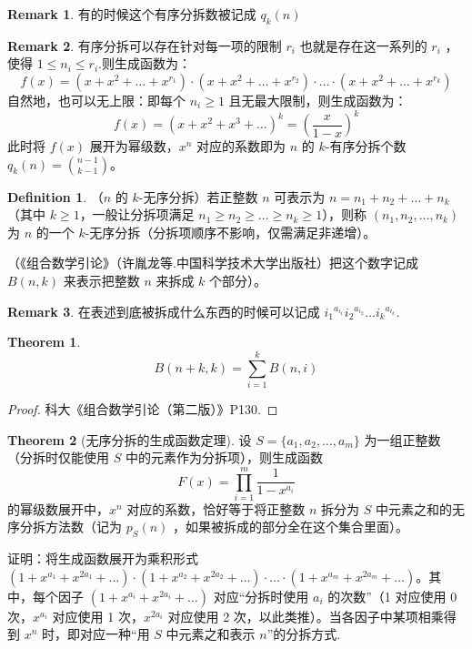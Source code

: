 \documentclass[oneside]{book}
\theoremstyle{definition}
\newtheorem{definition}{Definition}[section]
\newtheorem{theorem}{Theorem}[section]
\newtheorem{remark}{Remark}[section]
\begin{document}
\begin{remark}
	有的时候这个有序分拆数被记成 \(q_k(n)\)
\end{remark}
\begin{remark}
	有序分拆可以存在针对每一项的限制 \(r_i\) 也就是存在这一系列的 \(r_i\) ，使得 \(1\leq n_i\leq r_i\).则生成函数为：
	\[
	f(x) = (x + x^2 + \dots + x^{r_1}) \cdot (x + x^2 + \dots + x^{r_2}) \cdot \dots \cdot (x + x^2 + \dots + x^{r_k})
	\]
	自然地，也可以无上限：即每个 \( n_i \geq 1 \) 且无最大限制，则生成函数为：
	\[
	f(x) = (x + x^2 + x^3 + \dots)^k = \left( \frac{x}{1 - x} \right)^k
	\]
	此时将 \( f(x) \) 展开为幂级数，\( x^n \) 对应的系数即为 \( n \) 的 \( k \)-有序分拆个数 \( q_k(n)=\binom{n-1}{k-1} \)。
\end{remark}
\begin{definition}
	（\( n \) 的 \( k \)-无序分拆）若正整数 \( n \) 可表示为 \( n = n_1 + n_2 + \dots + n_k \)（其中 \( k \geq 1 \)，一般让分拆项满足 \( n_1 \geq n_2 \geq \dots \geq n_k \geq 1 \)），则称 \( (n_1, n_2, \dots, n_k) \) 为 \( n \) 的一个 \( k \)-无序分拆（分拆项顺序不影响，仅需满足非递增）。
	
	（《组合数学引论》（许胤龙等.中国科学技术大学出版社）把这个数字记成 \(B(n,k)\) 来表示把整数 \(n\) 来拆成 \(k\) 个部分）。
\end{definition}

\begin{remark}
	在表述到底被拆成什么东西的时候可以记成 \({i_1}^{a_{i_1}}{i_2}^{a_{i_2}}\dots {i_k}^{a_{i_k}}\).
\end{remark}

\begin{theorem}
	\[B(n+k,k)=\sum_{i=1}^{k}B(n,i)\]
\end{theorem}

\begin{proof}
	科大《组合数学引论（第二版）》P130.
\end{proof}
\begin{theorem}[无序分拆的生成函数定理]
	设 \( S = \{a_1, a_2, \dots, a_m\} \) 为一组正整数（分拆时仅能使用 \( S \) 中的元素作为分拆项），则生成函数 \[ F(x) = \prod_{i=1}^m \frac{1}{1 - x^{a_i}} \] 的幂级数展开中，\( x^n \) 对应的系数，恰好等于将正整数 \( n \) 拆分为 \( S \) 中元素之和的无序分拆方法数（记为 \( p_S(n) \) ，如果被拆成的部分全在这个集合里面）。
	
	证明：将生成函数展开为乘积形式 \( (1 + x^{a_1} + x^{2a_1} + \dots) \cdot (1 + x^{a_2} + x^{2a_2} + \dots) \cdot \dots \cdot (1 + x^{a_m} + x^{2a_m} + \dots) \)。其中，每个因子 \( (1 + x^{a_i} + x^{2a_i} + \dots) \) 对应“分拆时使用 \( a_i \) 的次数”（1 对应使用 0 次，\( x^{a_i} \) 对应使用 1 次，\( x^{2a_i} \) 对应使用 2 次，以此类推）。当各因子中某项相乘得到 \( x^n \) 时，即对应一种“用 \( S \) 中元素之和表示 \( n \)”的分拆方式.
\end{theorem}
\end{document}
